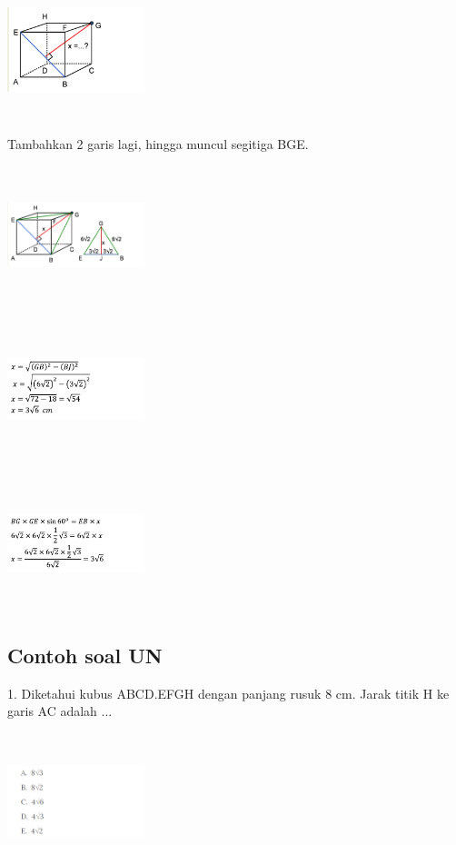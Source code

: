 \documentclass[11pt,fleqn]{book} %
\begin{document}
\includegraphics[width = 4cm, height= 4cm]{Pictures/gi25.png}

Tambahkan 2 garis lagi, hingga muncul segitiga BGE. 

\includegraphics[width = 4cm, height= 4cm]{Pictures/gi26.png}

\includegraphics[width = 4cm, height= 4cm]{Pictures/gi27.png}

\includegraphics[width = 4cm, height= 4cm]{Pictures/gi28.png}


\subsection{Contoh soal UN}
1. Diketahui kubus ABCD.EFGH dengan panjang rusuk 8 cm. Jarak titik H ke garis AC adalah ...

\includegraphics[width = 4cm, height= 4cm]{Pictures/gi29.png}
\end{document}
